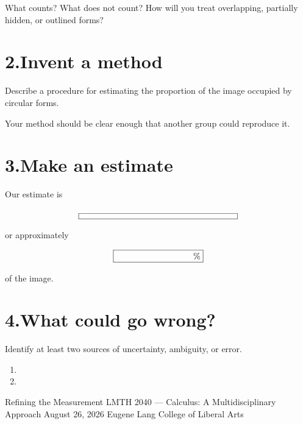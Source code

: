 \documentclass[11pt]{article}
\begin{document}
What counts? What does not count? How will you treat overlapping,
partially hidden, or outlined forms?

\vspace{1.25in}

\section*{2.\quad Invent a method}

Describe a procedure for estimating the proportion of the image
occupied by circular forms.

Your method should be clear enough that another group could
reproduce it.

\vspace{1.5in}

\section*{3.\quad Make an estimate}

Our estimate is

\[
    \boxed{\hspace{2.5in}}
\]

or approximately

\[
    \boxed{\hspace{1.25in}\%}
\]

of the image.

\section*{4.\quad What could go wrong?}

Identify at least two sources of uncertainty, ambiguity, or error.

\begin{enumerate}[label=\arabic*., leftmargin=2em]
    \item \vspace{0.45in}
    \item \vspace{0.45in}
\end{enumerate}

\newpage


\courseheader
    {Refining the Measurement}
    {LMTH 2040 --- Calculus: A Multidisciplinary Approach}
    {August 26, 2026}
    {Eugene Lang College of Liberal Arts}
\end{document}
